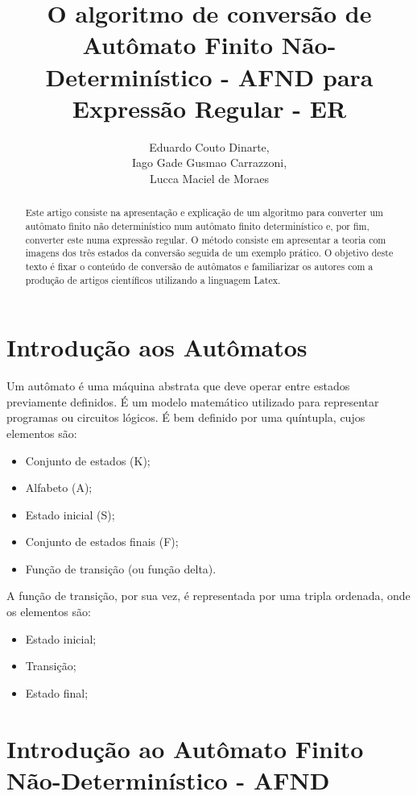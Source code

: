 \documentclass[a4paper,10pt]{article} %
\title{O algoritmo de conversão de Autômato Finito Não-Determinístico - AFND para Expressão Regular - ER}
\author{Eduardo Couto Dinarte,\\ Iago Gade Gusmao Carrazzoni,\\ Lucca Maciel de Moraes}
\begin{document}
\maketitle

\begin{abstract}

Este artigo consiste na apresenta\c{c}\~{a}o e explica\c{c}\~{a}o de um algoritmo para converter um aut\^{o}mato finito n\~{a}o determin\'{i}stico num aut\^{o}mato finito determin\'{i}stico e, por fim, converter este numa express\~{a}o regular. O m\'{e}todo consiste em apresentar a teoria com imagens dos tr\^{e}s estados da convers\~{a}o seguida de um exemplo pr\'{a}tico. O objetivo deste texto \'{e} fixar o conte\'{u}do de convers\~{a}o de aut\^{o}matos e familiarizar os autores com a produ\c{c}\~{a}o de artigos cient\'{i}ficos utilizando a linguagem Latex.

\end{abstract}

\section{Introdução aos Autômatos}

Um autômato é uma máquina abstrata que deve operar entre estados previamente definidos. É um modelo matemático utilizado para representar programas ou circuitos lógicos. É bem definido por uma quíntupla, cujos elementos são:
    \begin{itemize}
        \item Conjunto de estados (K);
        \item Alfabeto (A);
        \item Estado inicial (S);
        \item Conjunto de estados finais (F);
        \item Função de transição (ou função delta).
    \end{itemize}

A função de transição, por sua vez, é representada por uma tripla ordenada, onde os elementos são:
    \begin{itemize}
        \item Estado inicial;
        \item Transição;
        \item Estado final;
    \end{itemize}

\section{Introdução ao Autômato Finito Não-Determinístico - AFND}
\end{document}
